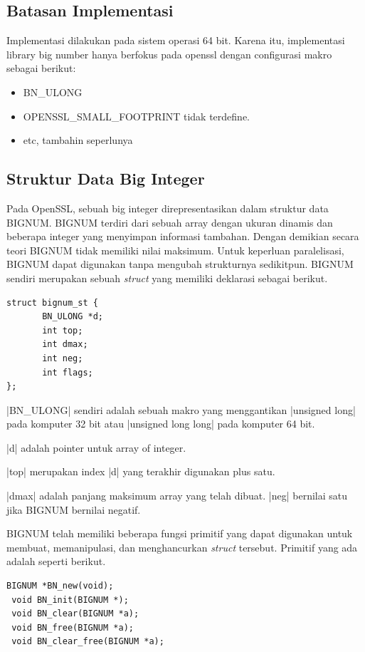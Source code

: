\subsection{Batasan Implementasi}
Implementasi dilakukan pada sistem operasi 64 bit. Karena itu, implementasi library big number hanya berfokus pada openssl dengan configurasi makro sebagai berikut:
\begin{itemize}
  \item BN\_ULONG
  \item OPENSSL\_SMALL\_FOOTPRINT tidak terdefine.
  \item etc, tambahin seperlunya
\end{itemize}

\subsection{Struktur Data Big Integer} \label{sec:bignum_struct}
Pada OpenSSL, sebuah big integer direpresentasikan dalam struktur data BIGNUM. BIGNUM terdiri dari sebuah array dengan ukuran dinamis dan beberapa integer yang menyimpan informasi tambahan. Dengan demikian secara teori BIGNUM tidak memiliki nilai maksimum. Untuk keperluan paralelisasi, BIGNUM dapat digunakan tanpa mengubah strukturnya sedikitpun. BIGNUM sendiri merupakan sebuah \textit{struct} yang memiliki deklarasi sebagai berikut.

\begin{lstlisting}[style = code]
struct bignum_st {
       BN_ULONG *d;
       int top;
       int dmax;
       int neg;
       int flags;
};
\end{lstlisting}

|BN_ULONG| sendiri adalah sebuah makro yang menggantikan |unsigned long| pada komputer 32 bit atau |unsigned long long| pada komputer 64 bit.

|d| adalah pointer untuk array of integer.

|top| merupakan index |d| yang terakhir digunakan plus satu.

|dmax| adalah panjang maksimum array yang telah dibuat. |neg| bernilai satu jika BIGNUM bernilai negatif.

BIGNUM telah memiliki beberapa fungsi primitif yang dapat digunakan untuk membuat, memanipulasi, dan menghancurkan \textit{struct} tersebut. Primitif yang ada adalah seperti berikut.

\begin{lstlisting}[style = code]
 BIGNUM *BN_new(void);
 void BN_init(BIGNUM *);
 void BN_clear(BIGNUM *a);
 void BN_free(BIGNUM *a);
 void BN_clear_free(BIGNUM *a);
\end{lstlisting}

